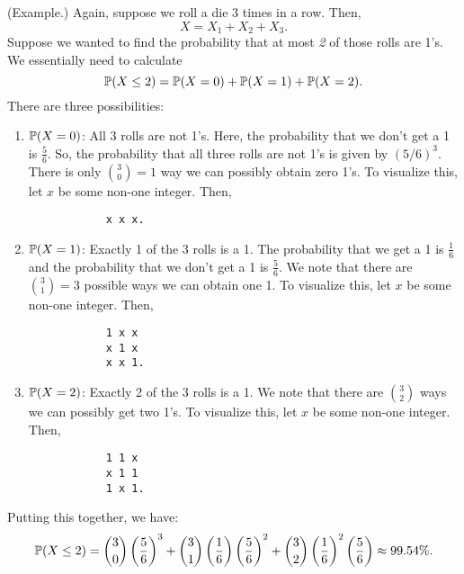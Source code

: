 \begin{mdframed}[]
    (Example.) Again, suppose we roll a die 3 times in a row. Then, 
    \[X = X_1 + X_2 + X_3.\]
    Suppose we wanted to find the probability that at most \emph{2} of those rolls are 1's. We essentially need to calculate 
    \[\mathbb{P}(X \leq 2) = \mathbb{P}(X = 0) + \mathbb{P}(X = 1) + \mathbb{P}(X = 2).\]
    There are three possibilities: 
    \begin{enumerate}[\hspace{0.5cm}(a)]
        \item $\mathbb{P}(X = 0)$: All 3 rolls are not 1's. Here, the probability that we don't get a 1 is $\frac{5}{6}$. So, the probability that all three rolls are not 1's is given by $(5 / 6)^3$. There is only $\binom{3}{0} = 1$ way we can possibly obtain zero 1's. To visualize this, let $x$ be some non-one integer. Then,
        \begin{verbatim}
            x x x.\end{verbatim}
        \item $\mathbb{P}(X = 1)$: Exactly 1 of the 3 rolls is a 1. The probability that we get a 1 is $\frac{1}{6}$ and the probability that we don't get a 1 is $\frac{5}{6}$. We note that there are $\binom{3}{1} = 3$ possible ways we can obtain one 1. To visualize this, let $x$ be some non-one integer. Then,
        \begin{verbatim}
            1 x x
            x 1 x
            x x 1.\end{verbatim}
        \item $\mathbb{P}(X = 2)$: Exactly 2 of the 3 rolls is a 1. We note that there are $\binom{3}{2}$ ways we can possibly get two 1's.  To visualize this, let $x$ be some non-one integer. Then,
        \begin{verbatim}
            1 1 x
            x 1 1
            1 x 1.\end{verbatim}
    \end{enumerate}
    Putting this together, we have: 
    \[\mathbb{P}(X \leq 2) = \binom{3}{0} \left(\frac{5}{6}\right)^3 + \binom{3}{1} \left(\frac{1}{6}\right) \left(\frac{5}{6}\right)^2 + \binom{3}{2}\left(\frac{1}{6}\right)^2 \left(\frac{5}{6}\right) \approx 99.54\%.\]
\end{mdframed}


